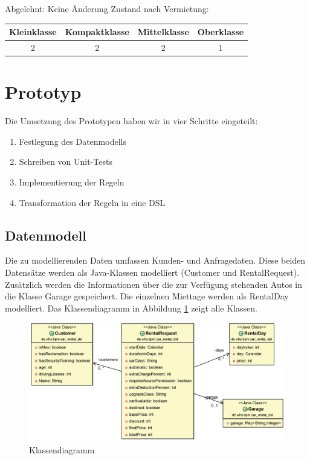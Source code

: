 Abgelehnt: Keine Änderung
Zustand nach Vermietung:\\
\begin{tabular}{|c|c|c|c|}
	\hline \textbf{Kleinklasse} & \textbf{Kompaktklasse} & \textbf{Mittelklasse} & \textbf{Oberklasse}  \\ 
	\hline 2 & 2 & 2 & 1 \\ 
	\hline 
\end{tabular}

\section{Prototyp}

Die Umsetzung des Prototypen haben wir in vier Schritte eingeteilt:
\begin{enumerate}
	\item Festlegung des Datenmodells
	\item Schreiben von Unit-Tests
	\item Implementierung der Regeln
	\item Transformation der Regeln in eine DSL 
\end{enumerate}

\subsection{Datenmodell}

Die zu modellierenden Daten umfassen Kunden- und Anfragedaten. Diese beiden Datensätze
werden als Java-Klassen modelliert (Customer und RentalRequest). Zusätzlich werden die
Informationen über die zur Verfügung stehenden Autos in die Klasse Garage gespeichert.
Die einzelnen Miettage werden als RentalDay modelliert. Das Klassendiagramm in
Abbildung \ref{fig:Class_All} zeigt alle Klassen.

\begin{figure}[tbh]
\centering
\includegraphics[width=1.0\linewidth]{Bilder/Class_All}
\caption{Klassendiagramm}
\label{fig:Class_All}
\end{figure}

